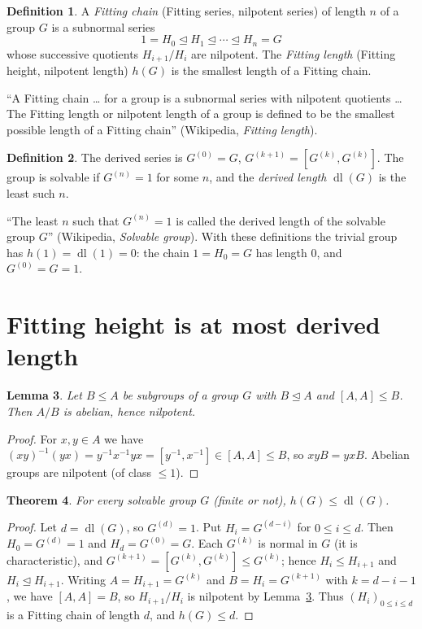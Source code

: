 \documentclass[11pt]{article}
\newtheorem{theorem}{Theorem}
\newtheorem{lemma}[theorem]{Lemma}
\theoremstyle{definition}
\newtheorem{definition}[theorem]{Definition}
\theoremstyle{remark}
\renewcommand{\_}{\oldus\allowbreak}
\newcommand{\dl}{\operatorname{dl}}
\begin{document}
\begin{definition}
A \emph{Fitting chain} (Fitting series, nilpotent series) of length $n$ of a group $G$ is a subnormal series
\[
  1 = H_0 \trianglelefteq H_1 \trianglelefteq \cdots \trianglelefteq H_n = G
\]
whose successive quotients $H_{i+1}/H_i$ are nilpotent. The \emph{Fitting length} (Fitting height,
nilpotent length) $h(G)$ is the smallest length of a Fitting chain.
\end{definition}

``A Fitting chain \dots{} for a group is a subnormal series with nilpotent quotients \dots{} The Fitting
length or nilpotent length of a group is defined to be the smallest possible length of a Fitting chain''
(Wikipedia, \emph{Fitting length}).

\begin{definition}
The derived series is $G^{(0)} = G$, $G^{(k+1)} = [G^{(k)}, G^{(k)}]$. The group is solvable if
$G^{(n)} = 1$ for some $n$, and the \emph{derived length} $\dl(G)$ is the least such $n$.
\end{definition}

``The least $n$ such that $G^{(n)} = 1$ is called the derived length of the solvable group $G$''
(Wikipedia, \emph{Solvable group}). With these definitions the trivial group has $h(1) = \dl(1) = 0$:
the chain $1 = H_0 = G$ has length $0$, and $G^{(0)} = G = 1$.

\section{Fitting height is at most derived length}

\begin{lemma}\label{lem:abelian}
Let $B \le A$ be subgroups of a group $G$ with $B \trianglelefteq A$ and $[A,A] \le B$. Then $A/B$ is abelian,
hence nilpotent.
\end{lemma}

\begin{proof}
For $x,y\in A$ we have $(xy)^{-1}(yx) = y^{-1}x^{-1}yx = [y^{-1},x^{-1}] \in [A,A] \le B$, so $xyB = yxB$.
Abelian groups are nilpotent (of class $\le 1$).
\end{proof}

\begin{theorem}\label{thm:main}
For every solvable group $G$ (finite or not), $h(G) \le \dl(G)$.
\end{theorem}

\begin{proof}
Let $d = \dl(G)$, so $G^{(d)} = 1$. Put $H_i = G^{(d-i)}$ for $0\le i\le d$. Then $H_0 = G^{(d)} = 1$ and
$H_d = G^{(0)} = G$. Each $G^{(k)}$ is normal in $G$ (it is characteristic), and
$G^{(k+1)} = [G^{(k)},G^{(k)}] \le G^{(k)}$; hence $H_i \le H_{i+1}$ and $H_i \trianglelefteq H_{i+1}$.
Writing $A = H_{i+1} = G^{(k)}$ and $B = H_i = G^{(k+1)}$ with $k = d-i-1$, we have $[A,A] = B$, so
$H_{i+1}/H_i$ is nilpotent by Lemma~\ref{lem:abelian}. Thus $(H_i)_{0\le i\le d}$ is a Fitting chain of
length $d$, and $h(G) \le d$.
\end{proof}
\end{document}
